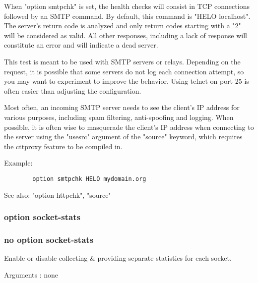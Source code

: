   When "option smtpchk" is set, the health checks will consist in TCP
  connections followed by an SMTP command. By default, this command is
  "HELO localhost". The server's return code is analyzed and only return codes
  starting with a "2" will be considered as valid. All other responses,
  including a lack of response will constitute an error and will indicate a
  dead server.

  This test is meant to be used with SMTP servers or relays. Depending on the
  request, it is possible that some servers do not log each connection attempt,
  so you may want to experiment to improve the behavior. Using telnet on port
  25 is often easier than adjusting the configuration.

  Most often, an incoming SMTP server needs to see the client's IP address for
  various purposes, including spam filtering, anti-spoofing and logging. When
  possible, it is often wise to masquerade the client's IP address when
  connecting to the server using the "usesrc" argument of the "source" keyword,
  which requires the cttproxy feature to be compiled in.

  Example:
\begin{verbatim}
        option smtpchk HELO mydomain.org
\end{verbatim}

  See also: "option httpchk", "source"

\subsubsection{option socket-stats}
\subsubsection{no option socket-stats}


  Enable or disable collecting \& providing separate statistics for each socket.


  Arguments : none

\endinput

option splice-auto
no option splice-auto
  Enable or disable automatic kernel acceleration on sockets in both directions
  May be used in sections :   defaults | frontend | listen | backend
                                 yes   |    yes   |   yes  |   yes
  Arguments : none

  When this option is enabled either on a frontend or on a backend, haproxy
  will automatically evaluate the opportunity to use kernel tcp splicing to
  forward data between the client and the server, in either direction. Haproxy
  uses heuristics to estimate if kernel splicing might improve performance or
  not. Both directions are handled independently. Note that the heuristics used
  are not much aggressive in order to limit excessive use of splicing. This
  option requires splicing to be enabled at compile time, and may be globally
  disabled with the global option "nosplice". Since splice uses pipes, using it
  requires that there are enough spare pipes.

